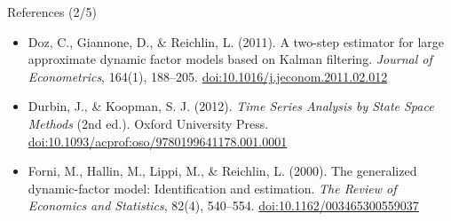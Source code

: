 \begin{frame}{References (2/5)}
\begin{itemize}
    \item Doz, C., Giannone, D., \& Reichlin, L. (2011). A two-step estimator for large approximate dynamic factor models based on Kalman filtering. \textit{Journal of Econometrics}, 164(1), 188--205. \href{https://doi.org/10.1016/j.jeconom.2011.02.012}{doi:10.1016/j.jeconom.2011.02.012}
    \item Durbin, J., \& Koopman, S. J. (2012). \textit{Time Series Analysis by State Space Methods} (2nd ed.). Oxford University Press. \href{https://doi.org/10.1093/acprof:oso/9780199641178.001.0001}{doi:10.1093/acprof:oso/9780199641178.001.0001}
    \item Forni, M., Hallin, M., Lippi, M., \& Reichlin, L. (2000). The generalized dynamic-factor model: Identification and estimation. \textit{The Review of Economics and Statistics}, 82(4), 540--554. \href{https://doi.org/10.1162/003465300559037}{doi:10.1162/003465300559037}
\end{itemize}
\end{frame}

